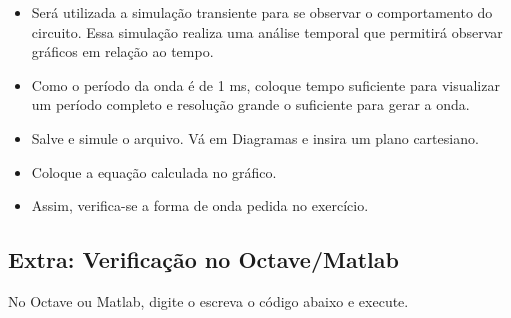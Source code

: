 \begin{itemize}
    \item Será utilizada a simulação transiente para se
    observar o comportamento do circuito. Essa
    simulação realiza uma análise temporal que permitirá
    observar gráficos em relação ao tempo.
\end{itemize}


\begin{itemize}
    \item Como o período da onda é de 1 ms, coloque tempo
    suficiente para visualizar um período completo e
    resolução grande o suficiente para gerar a onda.
\end{itemize}



\begin{itemize}
    \item Salve e simule o arquivo. Vá em Diagramas e insira um plano cartesiano.
\end{itemize}


\begin{itemize}
    \item Coloque a equação calculada no gráfico.
\end{itemize}


\begin{itemize}
    \item Assim, verifica-se a forma de onda pedida no
    exercício.
\end{itemize}


\newpage

\subsection{Extra: Verificação no Octave/Matlab}

No Octave ou Matlab, digite o escreva o código abaixo e execute.


 
